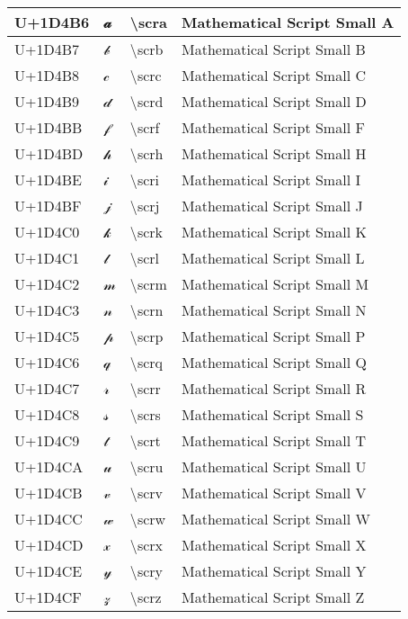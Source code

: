 \begin{table}[h]
\begin{tabulary}{\linewidth}{|L|L|L|L|}
\hline
U+1D4B6 & 𝒶 & {\textbackslash}scra & Mathematical Script Small A \\
\hline
U+1D4B7 & 𝒷 & {\textbackslash}scrb & Mathematical Script Small B \\
\hline
U+1D4B8 & 𝒸 & {\textbackslash}scrc & Mathematical Script Small C \\
\hline
U+1D4B9 & 𝒹 & {\textbackslash}scrd & Mathematical Script Small D \\
\hline
U+1D4BB & 𝒻 & {\textbackslash}scrf & Mathematical Script Small F \\
\hline
U+1D4BD & 𝒽 & {\textbackslash}scrh & Mathematical Script Small H \\
\hline
U+1D4BE & 𝒾 & {\textbackslash}scri & Mathematical Script Small I \\
\hline
U+1D4BF & 𝒿 & {\textbackslash}scrj & Mathematical Script Small J \\
\hline
U+1D4C0 & 𝓀 & {\textbackslash}scrk & Mathematical Script Small K \\
\hline
U+1D4C1 & 𝓁 & {\textbackslash}scrl & Mathematical Script Small L \\
\hline
U+1D4C2 & 𝓂 & {\textbackslash}scrm & Mathematical Script Small M \\
\hline
U+1D4C3 & 𝓃 & {\textbackslash}scrn & Mathematical Script Small N \\
\hline
U+1D4C5 & 𝓅 & {\textbackslash}scrp & Mathematical Script Small P \\
\hline
U+1D4C6 & 𝓆 & {\textbackslash}scrq & Mathematical Script Small Q \\
\hline
U+1D4C7 & 𝓇 & {\textbackslash}scrr & Mathematical Script Small R \\
\hline
U+1D4C8 & 𝓈 & {\textbackslash}scrs & Mathematical Script Small S \\
\hline
U+1D4C9 & 𝓉 & {\textbackslash}scrt & Mathematical Script Small T \\
\hline
U+1D4CA & 𝓊 & {\textbackslash}scru & Mathematical Script Small U \\
\hline
U+1D4CB & 𝓋 & {\textbackslash}scrv & Mathematical Script Small V \\
\hline
U+1D4CC & 𝓌 & {\textbackslash}scrw & Mathematical Script Small W \\
\hline
U+1D4CD & 𝓍 & {\textbackslash}scrx & Mathematical Script Small X \\
\hline
U+1D4CE & 𝓎 & {\textbackslash}scry & Mathematical Script Small Y \\
\hline
U+1D4CF & 𝓏 & {\textbackslash}scrz & Mathematical Script Small Z \\

\end{tabulary}
\end{table}

